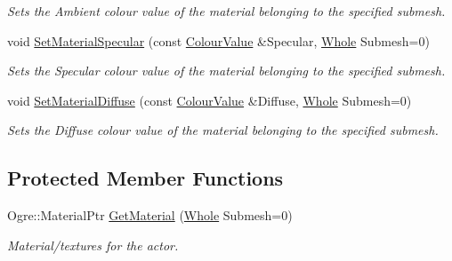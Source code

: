 \begin{DoxyCompactItemize}
\begin{DoxyCompactList}\small\item\em Sets the Ambient colour value of the material belonging to the specified submesh. \item\end{DoxyCompactList}\item 
void \hyperlink{classphys_1_1ActorGraphicsSettings_a51bfae72380679093595c1805b1d940b}{SetMaterialSpecular} (const \hyperlink{classphys_1_1ColourValue}{ColourValue} \&Specular, \hyperlink{namespacephys_a460f6bc24c8dd347b05e0366ae34f34a}{Whole} Submesh=0)
\begin{DoxyCompactList}\small\item\em Sets the Specular colour value of the material belonging to the specified submesh. \item\end{DoxyCompactList}\item 
void \hyperlink{classphys_1_1ActorGraphicsSettings_a135bebcafc6a2386aaec61bce7a5e548}{SetMaterialDiffuse} (const \hyperlink{classphys_1_1ColourValue}{ColourValue} \&Diffuse, \hyperlink{namespacephys_a460f6bc24c8dd347b05e0366ae34f34a}{Whole} Submesh=0)
\begin{DoxyCompactList}\small\item\em Sets the Diffuse colour value of the material belonging to the specified submesh. \item\end{DoxyCompactList}\end{DoxyCompactItemize}
\subsection*{Protected Member Functions}
\begin{DoxyCompactItemize}
\item 
\hypertarget{classphys_1_1ActorGraphicsSettings_ade1b760cc01187e9ffdeed8871533066}{
Ogre::MaterialPtr \hyperlink{classphys_1_1ActorGraphicsSettings_ade1b760cc01187e9ffdeed8871533066}{GetMaterial} (\hyperlink{namespacephys_a460f6bc24c8dd347b05e0366ae34f34a}{Whole} Submesh=0)}
\label{dd/dd6/classphys_1_1ActorGraphicsSettings_ade1b760cc01187e9ffdeed8871533066}

\begin{DoxyCompactList}\small\item\em Material/textures for the actor. \item\end{DoxyCompactList}\end{DoxyCompactItemize}
